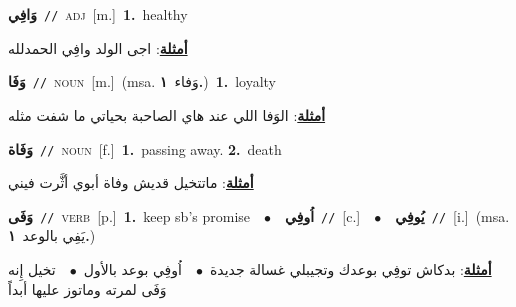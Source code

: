 \documentclass[10pt,a4paper,twoside]{article} %
\begin{document}
\begin{multicols}{2}
{\setlength\topsep{0pt}\textbf{\foreignlanguage{arabic}{وَافِي}}\ {\color{gray}\texttt{//}\color{black}}\ \textsc{adj}\ [m.]\ \textbf{1.}~healthy\  \begin{flushright}\color{gray}\foreignlanguage{arabic}{\textbf{\underline{\foreignlanguage{arabic}{أمثلة}}}: اجى الولد وافِي الحمدلله}\end{flushright}\color{black}} \vspace{2mm}

{\setlength\topsep{0pt}\textbf{\foreignlanguage{arabic}{وَفَا}}\ {\color{gray}\texttt{//}\color{black}}\ \textsc{noun}\ [m.]\ \color{gray}(msa. \foreignlanguage{arabic}{وَفاء}~\foreignlanguage{arabic}{\textbf{١.}})\color{black}\ \textbf{1.}~loyalty\  \begin{flushright}\color{gray}\foreignlanguage{arabic}{\textbf{\underline{\foreignlanguage{arabic}{أمثلة}}}: الوَفا اللي عند هاي الصاحبة بحياتي ما شفت مثله}\end{flushright}\color{black}} \vspace{2mm}

{\setlength\topsep{0pt}\textbf{\foreignlanguage{arabic}{وَفَاة}}\ {\color{gray}\texttt{//}\color{black}}\ \textsc{noun}\ [f.]\ \textbf{1.}~passing away.  \textbf{2.}~death\  \begin{flushright}\color{gray}\foreignlanguage{arabic}{\textbf{\underline{\foreignlanguage{arabic}{أمثلة}}}: ماتتخيل قديش وفاة أبوي أثَّرت فيني}\end{flushright}\color{black}} \vspace{2mm}

{\setlength\topsep{0pt}\textbf{\foreignlanguage{arabic}{وَفَى}}\ {\color{gray}\texttt{//}\color{black}}\ \textsc{verb}\ [p.]\ \textbf{1.}~keep sb's promise\ \ $\bullet$\ \ \setlength\topsep{0pt}\textbf{\foreignlanguage{arabic}{اُوفِي}}\ {\color{gray}\texttt{//}\color{black}}\ [c.]\ \ $\bullet$\ \ \setlength\topsep{0pt}\textbf{\foreignlanguage{arabic}{يُوفِي}}\ {\color{gray}\texttt{//}\color{black}}\ [i.]\ \color{gray}(msa. \foreignlanguage{arabic}{يَفِي بالوعد}~\foreignlanguage{arabic}{\textbf{١.}})\color{black}\  \begin{flushright}\color{gray}\foreignlanguage{arabic}{\textbf{\underline{\foreignlanguage{arabic}{أمثلة}}}: بدكاش توفِي بوعدك وتجيبلي غسالة جديدة\ $\bullet$\ \  اُوفِي بوعد بالأول\ $\bullet$\ \  تخيل إِنه وَفَى لمرته وماتوز عليها أبداً}\end{flushright}\color{black}} \vspace{2mm}


\end{multicols}
\end{document}
